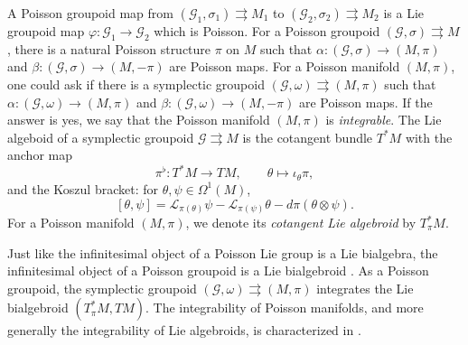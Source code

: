\documentclass{amsart}
\numberwithin{equation}{section}
\newcommand{\cG}{\mathcal{G}}
\newcommand{\cL}{\mathcal{L}}
\newcommand{\rra}{\rightrightarrows}
\begin{document}
A Poisson groupoid map from $(\cG_1, \sigma_1) \rra M_1$ to $(\cG_2, \sigma_2) \rra M_2$ is a Lie groupoid map $\varphi: \cG_1 \to \cG_2$ which is Poisson.
For a Poisson groupoid $(\cG, \sigma) \rra M$, there is a natural Poisson structure $\pi$ on $M$ such that $\alpha: (\cG, \sigma) \to (M, \pi)$ and $\beta: (\cG, \sigma) \to (M, -\pi)$ are Poisson maps.
For a Poisson manifold $(M, \pi)$, one could ask if there is a symplectic groupoid $(\cG, \omega) \rra (M, \pi)$ such that $\alpha: (\cG, \omega) \to (M, \pi)$ and $\beta: (\cG, \omega) \to (M, -\pi)$ are Poisson maps.
If the answer is yes, we say that the Poisson manifold $(M, \pi)$ is \emph{integrable}.
The Lie algeboid of a symplectic groupoid $\cG \rra M$ is the cotangent bundle $T^*M$ \cite{Wei87} with the anchor map
\[\pi^\flat: T^*M \to TM, \qquad \theta \mapsto \iota_\theta \pi,\]
and the Koszul bracket: for $\theta, \psi \in \Omega^1(M)$,
\[[\theta, \psi] = \cL_{\pi(\theta)} \psi - \cL_{\pi(\psi)} \theta - d\pi(\theta \otimes \psi).\]
For a Poisson manifold $(M, \pi)$, we denote its \emph{cotangent Lie algebroid} by $T^*_\pi M$.

Just like the infinitesimal object of a Poisson Lie group is a Lie bialgebra, the infinitesimal object of a Poisson groupoid is a Lie bialgebroid \cite{MX94}.
As a Poisson groupoid, the symplectic groupoid $(\cG, \omega) \rra (M, \pi)$ integrates the Lie bialgebroid $(T^*_\pi M, TM)$.
The integrability of Poisson manifolds, and more generally the integrability of Lie algebroids, is characterized in \cite{CF03, CF04}.
\end{document}
